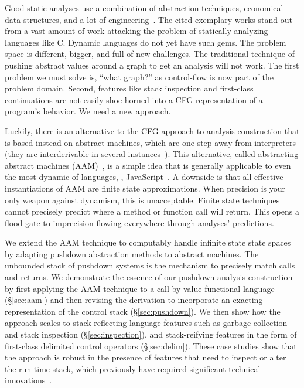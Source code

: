 Good static analyses use a combination of abstraction techniques, economical data structures, and a lot of engineering~\citep{ianjohnson:CousotEtAl-TASE07,ianjohnson:DBLP:journals/ipl/YiCKK07}.
%
The cited exemplary works stand out from a vast amount of work attacking the problem of statically analyzing languages like C.
%
Dynamic languages do not yet have such gems.
%
The problem space is different, bigger, and full of new challenges.
%
The traditional technique of pushing abstract values around a graph to get an analysis will not work.
%
The first problem we must solve is, ``what graph?'' as control-flow is now part of the problem domain.
%
Second, features like stack inspection and first-class continuations are not easily shoe-horned into a CFG representation of a program's behavior.
%
We need a new approach. %

%
Luckily, there is an alternative to the CFG approach to analysis construction that is based instead on abstract machines, which are one step away from interpreters (they are interderivable in several instances~\citep{ianjohnson:DBLP:conf/icfp/Danvy08}).
%
This alternative, called abstracting abstract machines
(AAM)~\citep{dvanhorn:VanHorn2012Systematic}, is a simple
idea that is generally applicable to even the most dynamic of
languages, \eg{},
JavaScript~\citep{ianjohnson:DBLP:journals/corr/KashyapDKWGSWH14}.
%
A downside is that all effective instantiations of AAM are finite state approximations.
%
When precision is your only weapon against dynamism, this is unacceptable.
%
Finite state techniques cannot precisely predict where a method or function call will return.
%
This opens a flood gate to imprecision flowing everywhere through analyses' predictions.
%

%
We extend the AAM technique to computably handle infinite state state spaces by adapting pushdown abstraction methods to abstract machines.
%
The unbounded stack of pushdown systems is the mechanism to precisely match calls and returns.
%
We demonstrate the essence of our pushdown analysis construction by
first applying the AAM technique to a call-by-value functional
language (\S\ref{sec:aam}) and then revising the derivation to
incorporate an exacting representation of the control stack
(\S\ref{sec:pushdown}).  We then show how the approach scales to
stack-reflecting language features such as garbage collection and
stack inspection (\S\ref{sec:inspection}), and stack-reifying features
in the form of first-class delimited control operators (\S\ref{sec:delim}).
%
These case studies show that the approach is robust in the presence of
features that need to inspect or alter the run-time stack, which
previously have required significant technical
innovations~\cite{ianjohnson:Vardoulakis2011Pushdown,ianjohnson:DBLP:journals/jfp/JohnsonSEMH14}.


